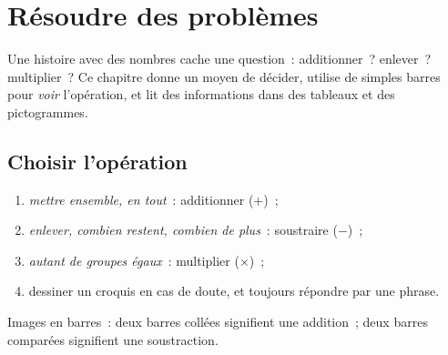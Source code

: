 \chapter{Résoudre des problèmes}\label{ch:g2:problems}

Une histoire avec des nombres cache une question~: additionner~?
enlever~? multiplier~? Ce chapitre donne un moyen de décider,
utilise de simples barres pour \emph{voir} l'opération, et lit des
informations dans des tableaux et des pictogrammes.

\section{Choisir l'opération}

\begin{method}\label{met:g2:problems:choose}
\begin{enumerate}
  \item \emph{mettre ensemble, en tout}~: additionner ($+$)~;
  \item \emph{enlever, combien restent, combien de plus}~:
        soustraire ($-$)~;
  \item \emph{autant de groupes égaux}~: multiplier ($\times$)~;
  \item dessiner un croquis en cas de doute, et toujours répondre
        par une phrase.
\end{enumerate}
\end{method}

\begin{omfigure}

{\small Images en barres~: deux barres collées signifient une
addition~; deux barres comparées signifient une soustraction.}
\end{omfigure}

